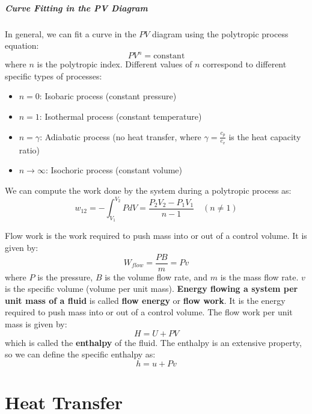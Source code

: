 \documentclass[11pt]{report}
\begin{document}
\paragraph{Curve Fitting in the PV Diagram} In general, we can fit a curve in the $PV$ diagram using the polytropic process equation:
\begin{equation}
    P V^n = \text{constant}
\end{equation}
where $n$ is the polytropic index. Different values of $n$ correspond to different specific types of processes:
\begin{itemize}
    \item $n = 0$: Isobaric process (constant pressure)
    \item $n = 1$: Isothermal process (constant temperature)
    \item $n = \gamma$: Adiabatic process (no heat transfer, where $\gamma = \frac{c_p}{c_v}$ is the heat capacity ratio)
    \item $n \to \infty$: Isochoric process (constant volume)
\end{itemize}
We can compute the work done by the system during a polytropic process as:
\begin{equation}
    w_{12} = -\int_{V_1}^{V_2} P dV = \frac{P_2 V_2 - P_1 V_1}{n - 1} \quad (n \neq 1)
\end{equation}

\begin{definition}
    Flow work is the work required to push mass into or out of a control volume. It is given by:
    \begin{equation}
        W_{flow} = \frac{PB}{m} = Pv
    \end{equation}
    where $P$ is the pressure, $B$ is the volume flow rate, and $m$ is the mass flow rate. $v$ is the specific volume (volume per unit mass).
    \textbf{Energy flowing a system per unit mass of a fluid} is called \textbf{flow energy} or \textbf{flow work}. It is the energy required to push mass into or out of a control volume. The flow work per unit mass is given by:
    \begin{equation}
       H = U + PV
    \end{equation}
    which is called the \textbf{enthalpy} of the fluid. The enthalpy is an extensive property, so we can define the specific enthalpy as:
    \begin{equation}
        h = u + Pv
    \end{equation}
\end{definition}




\chapter{Heat Transfer}
\end{document}
